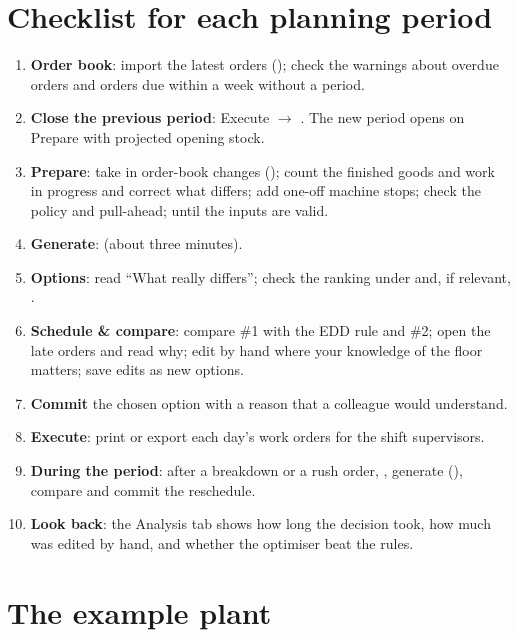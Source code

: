 \chapter{Checklist for each planning period}\label{app:checklist}

\begin{steps}
\begin{enumerate}[label=\textbf{\arabic*.}]
  \item \textbf{Order book}: import the latest orders (); check the warnings about overdue orders
        and orders due within a week without a period.
  \item \textbf{Close the previous period}: Execute $\rightarrow$ . The new period
        opens on Prepare with projected opening stock.
  \item \textbf{Prepare}: take in order-book changes (); count the finished goods and work in
        progress and correct what differs; add one-off machine stops; check the policy and pull-ahead;
         until the inputs are valid.
  \item \textbf{Generate}:  (about three minutes).
  \item \textbf{Options}: read ``What really differs''; check the ranking under  and, if
        relevant, .
  \item \textbf{Schedule \& compare}: compare \#1 with the EDD rule and \#2; open the late orders and read why;
        edit by hand where your knowledge of the floor matters; save edits as new options.
  \item \textbf{Commit} the chosen option with a reason that a colleague would understand.
  \item \textbf{Execute}: print or export each day's work orders for the shift supervisors.
  \item \textbf{During the period}: after a breakdown or a rush order, , generate
        (), compare and commit the reschedule.
  \item \textbf{Look back}: the Analysis tab shows how long the decision took, how much was edited by hand, and
        whether the optimiser beat the rules.
\end{enumerate}
\end{steps}

\chapter{The example plant}\label{app:plant}

